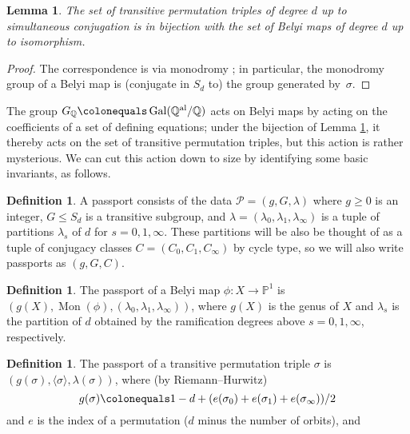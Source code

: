 \documentclass{dcthesis}
\newcommand{\PP}{\mathbb P}
\newcommand{\QQ}{\mathbb Q}
\newcommand{\defi}[1]{\textsf{#1}}
\newcommand{\QQal}{{\mathbb Q}^{\textup{al}}}
\DeclareMathOperator{\Mon}{Mon}
\DeclareMathOperator{\Gal}{Gal}
\numberwithin{equation}{section}
\newtheorem{lemma}[equation]{Lemma}
\theoremstyle{definition}
\newtheorem{definition}[equation]{Definition}
\theoremstyle{remark}
\begin{document}
{{\begin{lemma}
      \label{lem:simulisom}
      The set of transitive permutation triples of degree $d$ up to simultaneous
      conjugation is in bijection with the set of Belyi maps of degree $d$ up to
      isomorphism.
    \end{lemma}
    \begin{proof}
      The correspondence is via monodromy \cite[Lemma 1.1]{KMSV}; in particular,
      the monodromy group of a Belyi map is (conjugate in $S_d$ to) the group
      generated by~$\sigma$.
    \end{proof}
    The group $G_\QQ\colonequals\Gal(\QQal/ \QQ)$ acts on Belyi maps by acting on the
    coefficients of a set of defining equations; under the bijection of Lemma
    \ref{lem:simulisom}, it thereby acts on the set of transitive permutation
    triples, but this action is rather mysterious.
    We can cut this action down to size by identifying some basic invariants, as
    follows.
    \begin{definition}
      \label{def:passport}
      A \defi{passport} consists of the data $\mathcal{P}=(g,G,\lambda)$
      where $g \geq 0$ is an integer, $G \leq S_d$ is a transitive subgroup, and
      $\lambda=(\lambda_0,\lambda_1,\lambda_\infty)$ is a tuple of partitions
      $\lambda_s$ of $d$ for $s=0,1,\infty$.
      These partitions will be also be
      thought of as a tuple of conjugacy classes $C=(C_0,C_1,C_\infty)$ by cycle
      type, so we will also write passports as $(g,G,C)$.
    \end{definition}
    \begin{definition}
      \label{def:passportofbelyimap}
      The \defi{passport} of a
      Belyi map $\phi\colon X \to \PP^1$ is $(g(X),\Mon(\phi),
      (\lambda_0,\lambda_1,\lambda_\infty))$,
      where $g(X)$ is the genus of $X$ and
      $\lambda_s$ is the partition of $d$ obtained by the ramification degrees above
      $s=0,1,\infty$, respectively.
    \end{definition}
    \begin{definition}
      \label{def:passportofpermutationtriple}
      The \defi{passport} of a transitive
      permutation triple $\sigma$ is
      $(g(\sigma),\langle \sigma \rangle, \lambda(\sigma))$,
      where (by Riemann--Hurwitz)
      \begin{equation}\label{eqn:riemannhurwitzfortriples}
        g(\sigma) \colonequals 1-d+(e(\sigma_0)+e(\sigma_1)+e(\sigma_\infty))/2
      \end{equation}
      and $e$ is the index of a permutation ($d$ minus the number of orbits), and

\end{definition}}}
\end{document}
